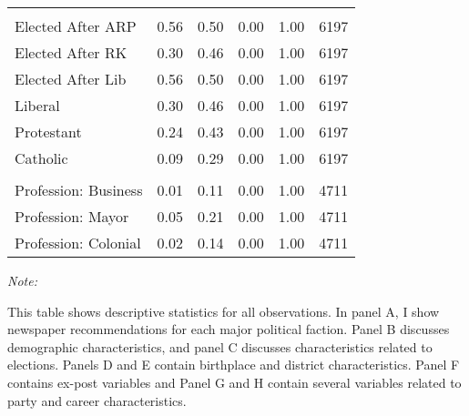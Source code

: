 \begin{table}[!h]
{\begin{threeparttable}
\begin{tabular}[t]{lrrrrr}
\addlinespace[0.3em]
\multicolumn{6}{l}{\textbf{Panel G: Party and Career Characteristics}}\\
\hspace{1em}Elected After ARP & \num{0.56} & \num{0.50} & \num{0.00} & \num{1.00} & 6197\\
\hspace{1em}Elected After RK & \num{0.30} & \num{0.46} & \num{0.00} & \num{1.00} & 6197\\
\hspace{1em}Elected After Lib & \num{0.56} & \num{0.50} & \num{0.00} & \num{1.00} & 6197\\
\hspace{1em}Liberal & \num{0.30} & \num{0.46} & \num{0.00} & \num{1.00} & 6197\\
\hspace{1em}Protestant & \num{0.24} & \num{0.43} & \num{0.00} & \num{1.00} & 6197\\
\hspace{1em}Catholic & \num{0.09} & \num{0.29} & \num{0.00} & \num{1.00} & 6197\\
\addlinespace[0.3em]
\multicolumn{6}{l}{\textbf{Panel H: Career Paths}}\\
\hspace{1em}Profession: Business & \num{0.01} & \num{0.11} & \num{0.00} & \num{1.00} & 4711\\
\hspace{1em}Profession: Mayor & \num{0.05} & \num{0.21} & \num{0.00} & \num{1.00} & 4711\\
\hspace{1em}Profession: Colonial & \num{0.02} & \num{0.14} & \num{0.00} & \num{1.00} & 4711\\
\bottomrule
\end{tabular}
\begin{tablenotes}[para]
\item \textit{Note: } 
\item This table shows descriptive statistics for all observations. In panel A, I show newspaper recommendations for each major political faction. Panel B discusses demographic characteristics, and panel C discusses characteristics related to elections. Panels D and E contain birthplace and district characteristics. Panel F contains ex-post variables and Panel G and H contain several variables related to party and career characteristics.
\end{tablenotes}
\end{threeparttable}}
\end{table}
